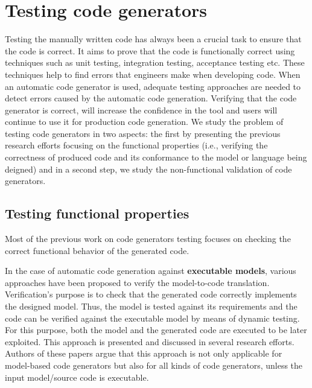 \section{Testing code generators}
\label{sec:Testing code generators}
Testing the manually written code has always been a crucial task to ensure that the code is correct. It aims to prove that the code is functionally correct using techniques such as unit testing, integration testing, acceptance testing etc. These techniques help to find errors that engineers make when developing code.
When an automatic code generator is used, adequate testing approaches are needed to detect errors caused by the automatic code generation. Verifying that the code generator is correct, will increase the confidence in the tool and users will continue to use it for production code generation. We study the problem of testing code generators in two aspects: the first by presenting the previous research efforts focusing on the functional properties (i.e., verifying the correctness of produced code and its conformance to the model or language being deigned) and in a second step, we study the non-functional validation of code generators. 

\subsection{Testing functional properties}

Most of the previous work on code generators testing focuses on checking the correct functional behavior of the generated code\cite{stuermer2007systematic,zelenov2006automatic,conrad2009testing,conrad2010code,jorges2014back,burnard2004verifying}. 

In the case of automatic code generation against \textbf{executable models}, various approaches have been proposed to verify the model-to-code translation. Verification's purpose is to check that the generated code correctly implements the designed model. Thus, the model is tested against its requirements and the code can be verified against the executable model by means of dynamic testing. For this purpose, both the model and the generated code are executed to be later exploited. This approach is presented and discussed in several research efforts\cite{sturmer2005overview,stuermer2007systematic,conrad2010code,jorges2014back,burnard2004verifying}. Authors of these papers argue that this approach is not only applicable for model-based code generators but also for all kinds of code generators, unless the input model/source code is executable.

